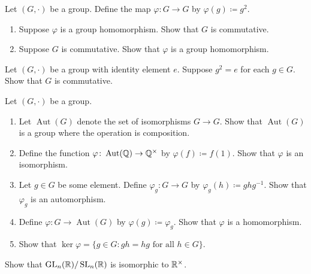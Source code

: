 \documentclass[../main.tex]{subfiles}
\begin{document}
\begin{homework}
    Let $(G,\cdot)$ be a group. Define the map $\varphi\colon G\to G$ by $\varphi(g)\coloneqq g^2$.
    \begin{enumerate}[label=(\alph*)]
        \item Suppose $\varphi$ is a group homomorphism. Show that $G$ is commutative.
        \item Suppose $G$ is commutative. Show that $\varphi$ is a group homomorphism.
    \end{enumerate}
\end{homework}

\begin{homework}
    Let $(G,\cdot)$ be a group with identity element $e$. Suppose $g^2=e$ for each $g\in G$. Show that $G$ is commutative.
\end{homework}

\begin{homework}
    Let $(G,\cdot)$ be a group.
    \begin{enumerate}[label=(\alph*)]
        \item Let $\operatorname{Aut}(G)$ denote the set of isomorphisms $G\to G$. Show that $\operatorname{Aut}(G)$ is a group where the operation is composition.
        \item Define the function $\varphi\colon\operatorname{Aut}(\mathbb Q)\to\mathbb Q^\times$ by $\varphi(f)\coloneqq f(1)$. Show that $\varphi$ is an isomorphism.
        \item Let $g\in G$ be some element. Define $\varphi_g\colon G\to G$ by $\varphi_g(h)\coloneqq ghg^{-1}$. Show that $\varphi_g$ is an automorphism.
        \item Define $\varphi\colon G\to\operatorname{Aut}(G)$ by $\varphi(g)\coloneqq\varphi_g$. Show that $\varphi$ is a homomorphism.
        \item Show that $\ker\varphi=\{g\in G:gh=hg\text{ for all }h\in G\}$.
    \end{enumerate}
\end{homework}

\begin{homework}
    Show that $\operatorname{GL}_n(\mathbb R)/\operatorname{SL}_n(\mathbb R)$ is isomorphic to $\mathbb R^\times$.
\end{homework}
\end{document}

